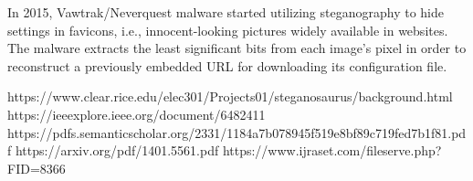 \documentclass[12ptpt,conference]{IEEEtran}
\begin{document}
\noindent In 2015, Vawtrak/Neverquest malware started utilizing steganography to
hide settings in favicons, i.e., innocent-looking pictures widely available in websites. The
malware extracts the least significant bits from each image’s pixel in order to reconstruct a
previously embedded URL for downloading its configuration file. 
 


\cleardoublepage
\begin{thebibliography}{}



 \bibitem{} https://www.clear.rice.edu/elec301/Projects01/steganosaurus/background.html
 \bibitem{} https://ieeexplore.ieee.org/document/6482411
 \bibitem{} https://pdfs.semanticscholar.org/2331/1184a7b078945f519e8bf89c719fed7b1f81.pdf
 \bibitem{} https://arxiv.org/pdf/1401.5561.pdf
 \bibitem{} https://www.ijraset.com/fileserve.php?FID=8366
 

\end{thebibliography}
\end{document}
